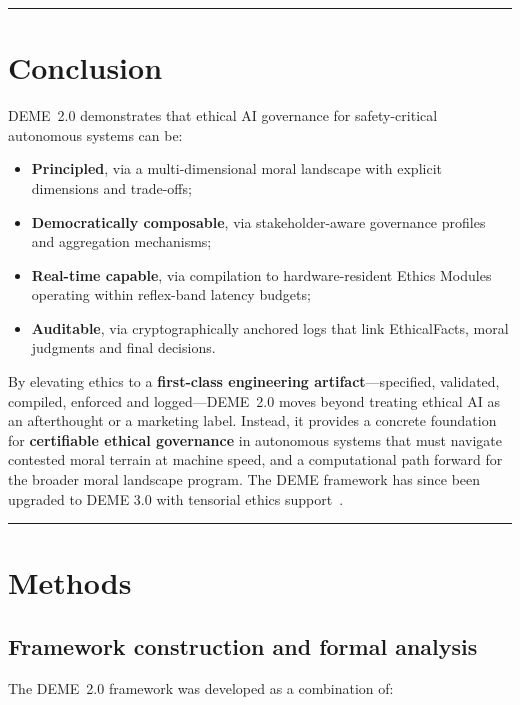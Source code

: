 \documentclass[11pt]{article}
\begin{document}
\hrule
\vspace{1em}

\section{Conclusion}

DEME~2.0 demonstrates that ethical AI governance for safety-critical autonomous systems can be:

\begin{itemize}
  \item \textbf{Principled}, via a multi-dimensional moral landscape with explicit dimensions and trade-offs;
  \item \textbf{Democratically composable}, via stakeholder-aware governance profiles and aggregation mechanisms;
  \item \textbf{Real-time capable}, via compilation to hardware-resident Ethics Modules operating within reflex-band latency budgets;
  \item \textbf{Auditable}, via cryptographically anchored logs that link EthicalFacts, moral judgments and final decisions.
\end{itemize}

By elevating ethics to a \textbf{first-class engineering artifact}---specified, validated, compiled, enforced and logged---DEME~2.0 moves beyond treating ethical AI as an afterthought or a marketing label. Instead, it provides a concrete foundation for \textbf{certifiable ethical governance} in autonomous systems that must navigate contested moral terrain at machine speed, and a computational path forward for the broader moral landscape program. The DEME framework has since been upgraded to DEME 3.0 with tensorial ethics support~\cite{bond2026erisml}.

\hrule
\vspace{1em}

\section*{Methods}

\subsection*{Framework construction and formal analysis}

The DEME~2.0 framework was developed as a combination of:
\end{document}
